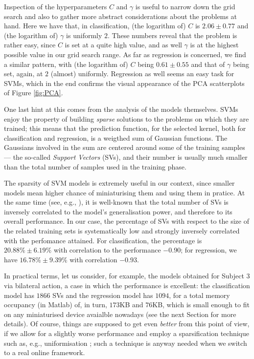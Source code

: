 Inspection of the hyperparameters $C$ and $\gamma$ is useful to narrow
down the grid search and also to gather more abstract considerations
about the problems at hand. Here we have that, in classification, (the
logarithm of) $C$ is $2.06 \pm 0.77$ and (the logarithm of) $\gamma$
is uniformly $2$. These numbers reveal that the problem is rather
easy, since $C$ is set at a quite high value, and as well $\gamma$ is at
the highest possible value in our grid search range. As far as
regression is concerned, we find a similar pattern, with (the
logarithm of) $C$ being $0.61 \pm 0.55$ and that of $\gamma$ being
set, again, at $2$ (almost) uniformly. Regression as well seems an
easy task for SVMs, which in the end confirms the visual appearance of
the PCA scatterplots of Figure \ref{fig:PCA}.

One last hint at this comes from the analysis of the models
themselves. SVMs enjoy the property of building \emph{sparse}
solutions to the problems on which they are trained; this means that
the prediction function, for the selected kernel, both for
classification and regression, is a weigthed sum of Gaussian
functions. The Gaussians involved in the sum are centered around some
of the training samples --- the so-called \emph{Support Vectors}
(SVs), and their number is usually much smaller than the total number
of samples used in the training phase.

The sparsity of SVM models is extremely useful in our context, since
smaller models mean higher chance of miniaturising them and using them
in pratice. At the same time (see, e.g., \cite{v-edbed-82}), it is
well-known that the total number of SVs is inversely correlated to the
model's generalisation power, and therefore to its overall
performance. In our case, the percentage of SVs with respect to the
size of the related training sets is systematically low and strongly
inversely correlated with the perfomance attained. For classification,
the percentage is $20.88\% \pm 6.19\%$ with correlation to the
performance $-0.90$; for regression, we have $16.78\% \pm 9.39\%$ with
correlation $-0.93$.

In practical terms, let us consider, for example, the models obtained
for Subject $3$ via bilateral action, a case in which the performance
is excellent: the classification model has $1866$ SVs and the
regression model has $1094$, for a total memory occupancy (in Matlab)
of, in turn, $173$KB and $76$KB, which is small enough to fit on any
miniaturised device avaialble nowadays (see the next Section for more
details). Of course, things are supposed to get even
\emph{better} from this point of view, if we allow for a slightly
worse performance and employ a sparsification technique such as, e.g.,
uniformisation \cite{2008.ICRA,2008.BioCyb}; such a technique is
anyway needed when we switch to a real online framework.
